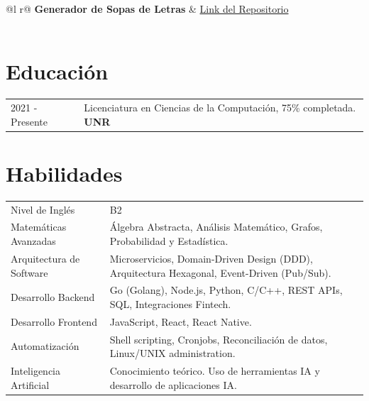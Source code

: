 \documentclass[a4paper,12pt]{article}
\begin{document}
\begin{tabularx}{\linewidth}{ @{}l r@{} }
\textbf{Generador de Sopas de Letras} & \hfill \href{https://github.com/llascola/sopa-letras-backtracking}{Link del Repositorio} \\[3.75pt]
  \\
\end{tabularx}

\section{Educación}
\begin{tabularx}{\linewidth}{@{}l L@{}}
2021 - Presente & Licenciatura en Ciencias de la Computación, 75\% completada. \textbf{UNR} \\
\end{tabularx}

\section{Habilidades}
\begin{tabularx}{\linewidth}{@{}l L@{}}
Nivel de Inglés        & B2 \\
Matemáticas Avanzadas  & Álgebra Abstracta, Análisis Matemático, Grafos, Probabilidad y Estadística. \\
Arquitectura de Software & Microservicios, Domain-Driven Design (DDD), Arquitectura Hexagonal, Event-Driven (Pub/Sub). \\
Desarrollo Backend     & Go (Golang), Node.js, Python, C/C++, REST APIs, SQL, Integraciones Fintech. \\
Desarrollo Frontend    & JavaScript, React, React Native. \\
Automatización         & Shell scripting, Cronjobs, Reconciliación de datos, Linux/UNIX administration. \\
Inteligencia Artificial & Conocimiento teórico. Uso de herramientas IA y desarrollo de aplicaciones IA. \\
\end{tabularx}
\end{document}

